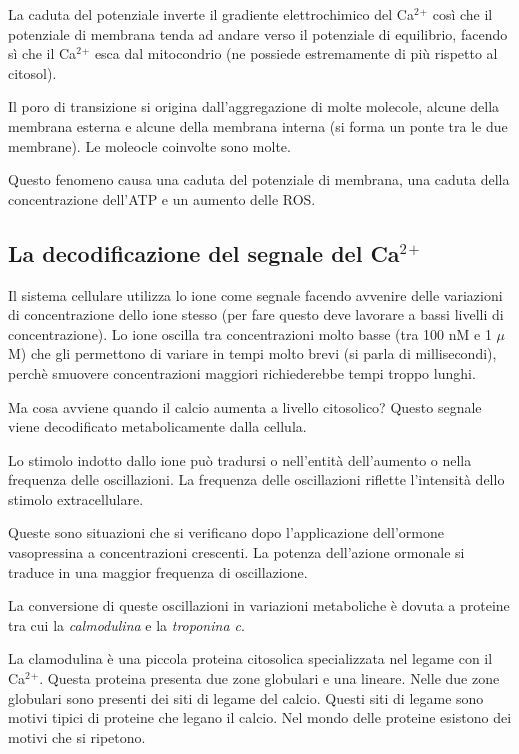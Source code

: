 \documentclass[]{article}
\begin{document}
La caduta del potenziale inverte il gradiente elettrochimico del
Ca\(^2\)\(^+\) così che il potenziale di membrana tenda ad andare verso
il potenziale di equilibrio, facendo sì che il Ca\(^2\)\(^+\) esca dal
mitocondrio (ne possiede estremamente di più rispetto al citosol).

Il poro di transizione si origina dall'aggregazione di molte molecole,
alcune della membrana esterna e alcune della membrana interna (si forma
un ponte tra le due membrane). Le moleocle coinvolte sono molte.

Questo fenomeno causa una caduta del potenziale di membrana, una caduta
della concentrazione dell'ATP e un aumento delle ROS.

\subsection{\texorpdfstring{La decodificazione del segnale del
Ca\(^2\)\(^+\)}{La decodificazione del segnale del Ca\^{}2\^{}+}}\label{la-decodificazione-del-segnale-del-ca2}

Il sistema cellulare utilizza lo ione come segnale facendo avvenire
delle variazioni di concentrazione dello ione stesso (per fare questo
deve lavorare a bassi livelli di concentrazione). Lo ione oscilla tra
concentrazioni molto basse (tra 100 nM e 1 \(\mu\)M) che gli permettono
di variare in tempi molto brevi (si parla di millisecondi), perchè
smuovere concentrazioni maggiori richiederebbe tempi troppo lunghi.

Ma cosa avviene quando il calcio aumenta a livello citosolico? Questo
segnale viene decodificato metabolicamente dalla cellula.

Lo stimolo indotto dallo ione può tradursi o nell'entità dell'aumento o
nella frequenza delle oscillazioni. La frequenza delle oscillazioni
riflette l'intensità dello stimolo extracellulare.

Queste sono situazioni che si verificano dopo l'applicazione dell'ormone
vasopressina a concentrazioni crescenti. La potenza dell'azione ormonale
si traduce in una maggior frequenza di oscillazione.

La conversione di queste oscillazioni in variazioni metaboliche è dovuta
a proteine tra cui la \emph{calmodulina} e la \emph{troponina c}.

La clamodulina è una piccola proteina citosolica specializzata nel
legame con il Ca\(^2\)\(^+\). Questa proteina presenta due zone
globulari e una lineare. Nelle due zone globulari sono presenti dei siti
di legame del calcio. Questi siti di legame sono motivi tipici di
proteine che legano il calcio. Nel mondo delle proteine esistono dei
motivi che si ripetono.
\end{document}
